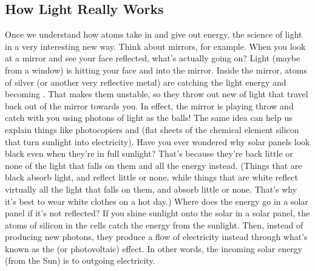 \subsection*{How Light Really Works}
Once we understand how atoms take in and give out energy, the science of light
\underline{\hspace{1.1cm}} in a very interesting new way. Think about
mirrors, for example. When you look at a mirror and see your face reflected, what's
actually going on? Light (maybe from a window) is hitting your face and 
\underline{\hspace{2cm}} into the mirror. Inside the mirror, atoms of silver (or another
very reflective metal) are catching the \underline{\hspace{2cm}} light
energy and becoming \underline{\hspace{2cm}}. That makes them unstable,
so they throw out new \underline{\hspace{2cm}} of light that travel back
out of the mirror towards you. In effect, the mirror is playing throw and catch with
you using photons of light as the balls!
The same idea can help us explain things like photocopiers and 
\underline{\hspace{2cm}} (flat sheets of the chemical element silicon that turn
sunlight into electricity). Have you ever wondered why solar panels look black even
when they're in full sunlight? That's because they're 
\underline{\hspace{2cm}} back little or none of the light that falls on them and
\underline{\hspace{2cm}} all the energy instead. (Things that are black
absorb light, and reflect little or none, while things that are white reflect virtually
all the light that falls on them, and absorb little or none. That's why it's best to
wear white clothes on a hot day.) Where does the energy go in a solar panel if it's not
reflected? If you shine sunlight onto the solar \underline{\hspace{2cm}}
in a solar panel, the atoms of silicon in the cells catch the energy from the sunlight.
Then, instead of producing new photons, they produce a flow of electricity instead
through what's known as the \underline{\hspace{2cm}} (or photovoltaic)
effect. In other words, the incoming solar energy (from the Sun) is 
\underline{\hspace{2cm}} to outgoing electricity.

